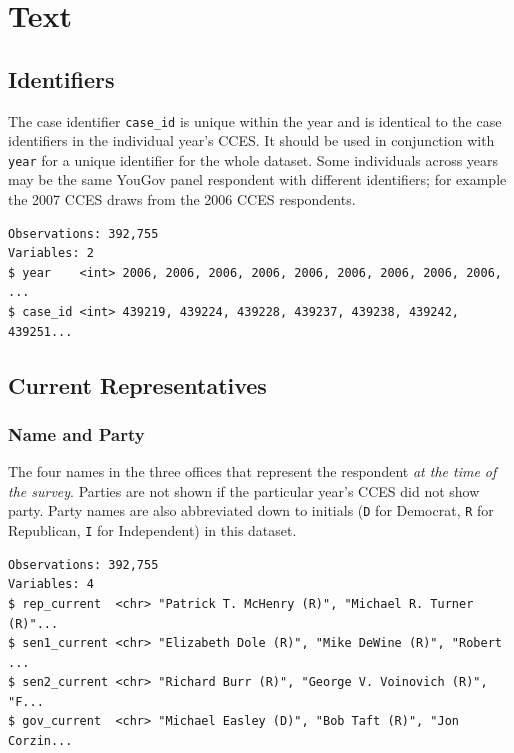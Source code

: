 \documentclass[10pt,article,oneside]{memoir}
\theoremstyle{definition}
\begin{document}
\newpage

\section{Text}\label{text}

\subsection{Identifiers}\label{identifiers}

The case identifier \texttt{case\_id} is unique within the year and is
identical to the case identifiers in the individual year's CCES. It
should be used in conjunction with \texttt{year} for a unique identifier
for the whole dataset. Some individuals across years may be the same
YouGov panel respondent with different identifiers; for example the 2007
CCES draws from the 2006 CCES respondents.

\begin{verbatim}
Observations: 392,755
Variables: 2
$ year    <int> 2006, 2006, 2006, 2006, 2006, 2006, 2006, 2006, 2006, ...
$ case_id <int> 439219, 439224, 439228, 439237, 439238, 439242, 439251...
\end{verbatim}

\subsection{Current Representatives}\label{current-representatives}

\subsubsection{Name and Party}\label{name-and-party}

The four names in the three offices that represent the respondent
\emph{at the time of the survey}. Parties are not shown if the
particular year's CCES did not show party. Party names are also
abbreviated down to initials (\texttt{D} for Democrat, \texttt{R} for
Republican, \texttt{I} for Independent) in this dataset.

\begin{verbatim}
Observations: 392,755
Variables: 4
$ rep_current  <chr> "Patrick T. McHenry (R)", "Michael R. Turner (R)"...
$ sen1_current <chr> "Elizabeth Dole (R)", "Mike DeWine (R)", "Robert ...
$ sen2_current <chr> "Richard Burr (R)", "George V. Voinovich (R)", "F...
$ gov_current  <chr> "Michael Easley (D)", "Bob Taft (R)", "Jon Corzin...
\end{verbatim}
\end{document}
